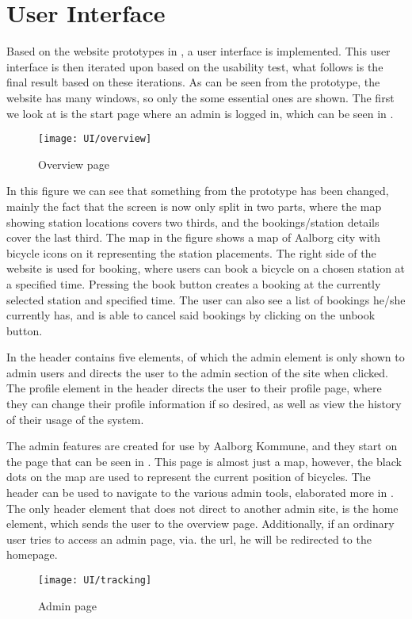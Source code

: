 \section{User Interface}
Based on the website prototypes in , a user interface is implemented. 
This user interface is then iterated upon based on the usability test, what follows is the final result based on these iterations. 
As can be seen from the prototype, the website has many windows, so only the some essential ones are shown.
The first we look at is the start page where an admin is logged in, which can be seen in .

\begin{figure}[h]
	\centering
	\texttt{[image: UI/overview]}
	\caption{Overview page}\label{fig:UI-overview}
\end{figure}

In this figure we can see that something from the prototype has been changed, mainly the fact that the screen is now only split in two parts, where the map showing station locations covers two thirds, and the bookings/station details cover the last third.
The map in the figure shows a map of Aalborg city with bicycle icons on it representing the station placements.
The right side of the website is used for booking, where users can book a bicycle on a chosen station at a specified time.
Pressing the book button creates a booking at the currently selected station and specified time.
The user can also see a list of bookings he/she currently has, and is able to cancel said bookings by clicking on the unbook button.

In  the header contains five elements, of which the admin element is only shown to admin users and directs the user to the admin section of the site when clicked.
The profile element in the header directs the user to their profile page, where they can change their profile information if so desired, as well as view the history of their usage of the system.


The admin features are created for use by Aalborg Kommune, and they start on the page that can be seen in .
This page is almost just a map, however, the black dots on the map are used to represent the current position of bicycles.
The header can be used to navigate to the various admin tools, elaborated more in .
The only header element that does not direct to another admin site, is the home element, which sends the user to the overview page.
Additionally, if an ordinary user tries to access an admin page, via. the url, he will be redirected to the homepage.

\begin{figure}[h]
	\centering
	\texttt{[image: UI/tracking]}
	\caption{Admin page}\label{fig:UI-admin}
\end{figure}
